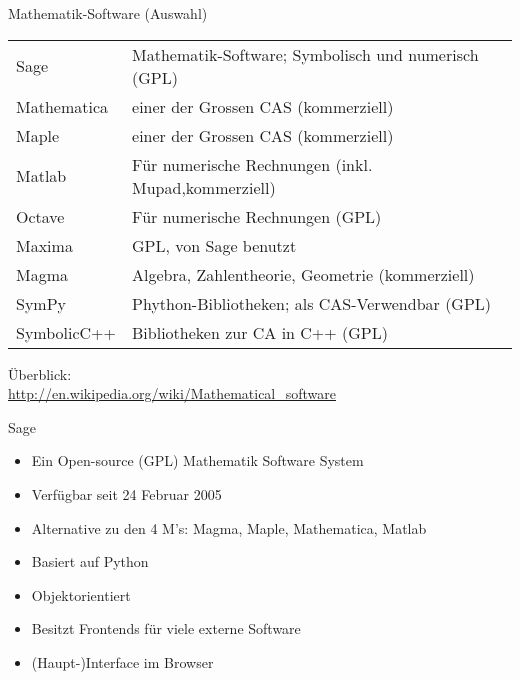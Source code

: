 \documentclass[hyperref={xetex}]{beamer}
\begin{document}
\begin{frame}{Mathematik-Software (Auswahl)}
\begin{small}
\begin{block}{}
\begin{tabular}{ll}
\alert{Sage} & Mathematik-Software; Symbolisch und numerisch (GPL)\\
\alert{Mathematica} &einer der Grossen CAS (kommerziell)\\
 \alert{Maple} &einer der Grossen CAS (kommerziell)\\
\alert{Matlab} &Für numerische Rechnungen (inkl. Mupad,kommerziell)\\
\alert{Octave} &Für numerische Rechnungen (GPL)\\
 \alert{Maxima} & GPL, von Sage benutzt\\
\alert{Magma} & Algebra, Zahlentheorie, Geometrie (kommerziell)\\
 \alert{SymPy} &Phython-Bibliotheken; als CAS-Verwendbar (GPL)\\
 \alert{SymbolicC++} &Bibliotheken zur CA in C++ (GPL)
\end{tabular}

\medskip
Überblick:\\{\scriptsize
\url{http://en.wikipedia.org/wiki/Mathematical_software} }
\end{block}

\end{small}
\end{frame}

\begin{frame}{Sage}
\begin{itemize}
\item Ein Open-source (GPL) Mathematik Software System
\item Verfügbar seit 24 Februar 2005
\item Alternative zu den 4 M's: Magma, Maple, Mathematica, Matlab
\item Basiert auf Python
\item Objektorientiert
\item Besitzt Frontends für viele externe Software 
\item (Haupt-)Interface im Browser 
\end{itemize}
\end{frame}
\end{document}

